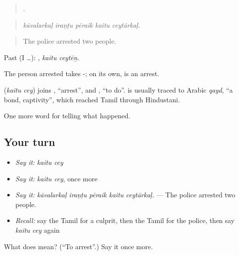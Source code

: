 \begin{quote}
    .
\end{quote}

\begin{quote}
\emph{kāvalarkaḷ iraṇṭu pēraik kaitu ceytārkaḷ.}
\end{quote}

\begin{quote}
The police arrested two people.
\end{quote}

Past (I …):  , \emph{kaitu ceytēṉ}.

The person arrested takes -; on its own,  is an arrest.

\begin{cousinweb}
\textbf{ } (\emph{kaitu cey}) joins , \textquotedblleft{}arrest\textquotedblright{}, and , \textquotedblleft{}to do\textquotedblright{}.  is usually traced to Arabic \emph{qayd}, \textquotedblleft{}a bond, captivity\textquotedblright{}, which reached Tamil through Hindustani.
\end{cousinweb}

\begin{grammarlens}[title={What you've built}]
One more word for telling what happened.
\end{grammarlens}

\subsection*{Your turn}
\begin{itemize}
\raggedright
  \item \emph{Say it:} \emph{kaitu cey}
  \item \emph{Say it:} \emph{kaitu cey}, once more
  \item \emph{Say it:} \emph{kāvalarkaḷ iraṇṭu pēraik kaitu ceytārkaḷ.} — The police arrested two people.
  \item \emph{Recall:} say the Tamil for a culprit, then the Tamil for the police, then say \emph{kaitu cey} again
\end{itemize}

\begin{tcolorbox}[breakable,colback=teal!4,colframe=teal!35!black,title={Before you move on}]
What does   mean? (\textquotedblleft{}To arrest\textquotedblright{}.) Say it once more.
\end{tcolorbox}
